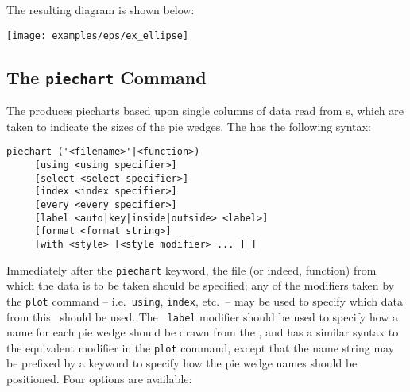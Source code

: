 {{\newline
}\\{\footnotesize
{}\newline
{}\newline
{}\newline
{}\newline
{}\newline
{}\newline
{}\newline
}\\{\footnotesize
{}\newline
{}\newline
}
\nlfcf
The resulting diagram is shown below:
\nlscf
\centerline{\texttt{[image: examples/eps/ex\_ellipse]}}
}

\subsection{The {\tt piechart} Command}
\label{sec:piechart}

The  produces piecharts based upon single columns of data
read from \datafile s, which are taken to indicate the sizes of the pie wedges.
The  has the following syntax:
\begin{verbatim}
piechart ('<filename>'|<function>)
     [using <using specifier>]
     [select <select specifier>]
     [index <index specifier>]
     [every <every specifier>]
     [label <auto|key|inside|outside> <label>]
     [format <format string>]
     [with <style> [<style modifier> ... ] ]
\end{verbatim}

Immediately after the {\tt piechart} keyword, the file (or indeed, function)
from which the data is to be taken should be specified; any of the modifiers
taken by the {\tt plot} command -- i.e.\ {\tt using}, {\tt index}, etc.\ -- may
be used to specify which data from this \datafile\ should be used. The {\tt
label} modifier should be used to specify how a name for each pie wedge should
be drawn from the \datafile, and has a similar syntax to the equivalent
modifier in the {\tt plot} command, except that the name string may be
prefixed by a keyword to specify how the pie wedge names should be positioned.
Four options are available:


